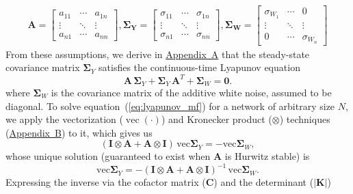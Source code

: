 \documentclass[12pt]{article}
\begin{document}
\begin{equation}
\begin{aligned}
\mathbf{A} =
\begin{bmatrix}
    a_{11}  & \cdots & a_{1n} \\
     \vdots & \ddots & \vdots  \\
    a_{n1}  & \cdots & a_{nn}
\end{bmatrix},
\mathbf{\Sigma_\mathbf{Y}}=
\begin{bmatrix}
    \sigma_{11}  & \cdots & \sigma_{1n} \\
     \vdots & \ddots & \vdots  \\
    \sigma_{n1}  & \cdots & \sigma_{nn}
\end{bmatrix},
\mathbf{\Sigma_\mathbf{W}} =
\begin{bmatrix}
    \sigma_{W_1}  & \cdots & 0 \\
     \vdots & \ddots & \vdots  \\
    0  & \cdots & \sigma_{W_n}
\end{bmatrix}
\end{aligned}
\label{eq:nByn_network_mf}
\end{equation}
From these assumptions, we derive in
\hyperref[app:appA]{Appendix~A} that the steady-state
covariance matrix $\mathbf{\Sigma}_Y$ satisfies the
continuous-time Lyapunov equation
\begin{equation}
\mathbf{A}\,\mathbf{\Sigma}_Y
+ \mathbf{\Sigma}_Y\,\mathbf{A}^T
+ \mathbf{\Sigma}_W = \mathbf{0}.
\label{eq:lyapunov_mf}
\end{equation}
where $\mathbf{\Sigma}_W$ is the covariance matrix of the additive white noise, assumed to be diagonal. To solve equation~(\ref{eq:lyapunov_mf}) for a
network of arbitrary size $N$, we apply the vectorization
($\operatorname{vec}(\cdot)$) and Kronecker product ($\otimes$)
techniques (\hyperref[app:appB]{Appendix~B}) to it, which gives us
\begin{equation}
(\mathbf{I}\otimes\mathbf{A}+\mathbf{A}\otimes\mathbf{I})\,
\mathrm{vec} \mathbf{\Sigma}_Y
= -\mathrm{vec} \mathbf{\Sigma}_W,
\label{eq:lyapunov_vec_results}
\end{equation}
whose unique solution (guaranteed to exist when $\mathbf{A}$ is Hurwitz
stable) is
\begin{equation}
\mathrm{vec}\mathbf{\Sigma}_Y =
-(\mathbf{I}\otimes\mathbf{A}+\mathbf{A}\otimes\mathbf{I})^{-1}
\,\mathrm{vec} \mathbf{\Sigma}_W.
\label{eq:sigma_nn}
\end{equation}
Expressing the inverse via the cofactor matrix ($\mathbf{C}$) and the determinant ($|\mathbf{K}|$)
\end{document}
